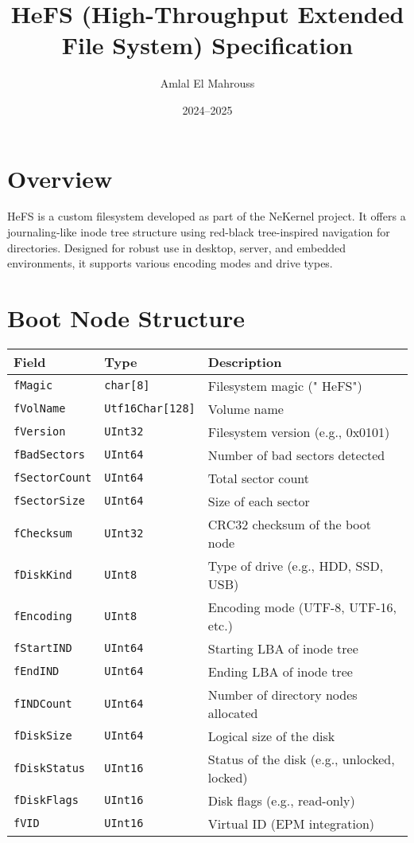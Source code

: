 \documentclass{article}
\title{HeFS (High-Throughput Extended File System) Specification}
\author{Amlal El Mahrouss}
\date{2024--2025}
\begin{document}
\maketitle

\section{Overview}
HeFS is a custom filesystem developed as part of the NeKernel project. It offers a journaling-like inode tree structure using red-black tree-inspired navigation for directories. Designed for robust use in desktop, server, and embedded environments, it supports various encoding modes and drive types.

\section{Boot Node Structure}
\begin{longtable}{|l|l|p{8cm}|}
\hline
\textbf{Field} & \textbf{Type} & \textbf{Description} \\
\hline
\verb|fMagic| & \verb|char[8]| & Filesystem magic ("  HeFS") \\
\verb|fVolName| & \verb|Utf16Char[128]| & Volume name \\
\verb|fVersion| & \verb|UInt32| & Filesystem version (e.g., 0x0101) \\
\verb|fBadSectors| & \verb|UInt64| & Number of bad sectors detected \\
\verb|fSectorCount| & \verb|UInt64| & Total sector count \\
\verb|fSectorSize| & \verb|UInt64| & Size of each sector \\
\verb|fChecksum| & \verb|UInt32| & CRC32 checksum of the boot node \\
\verb|fDiskKind| & \verb|UInt8| & Type of drive (e.g., HDD, SSD, USB) \\
\verb|fEncoding| & \verb|UInt8| & Encoding mode (UTF-8, UTF-16, etc.) \\
\verb|fStartIND| & \verb|UInt64| & Starting LBA of inode tree \\
\verb|fEndIND| & \verb|UInt64| & Ending LBA of inode tree \\
\verb|fINDCount| & \verb|UInt64| & Number of directory nodes allocated \\
\verb|fDiskSize| & \verb|UInt64| & Logical size of the disk \\
\verb|fDiskStatus| & \verb|UInt16| & Status of the disk (e.g., unlocked, locked) \\
\verb|fDiskFlags| & \verb|UInt16| & Disk flags (e.g., read-only) \\
\verb|fVID| & \verb|UInt16| & Virtual ID (EPM integration) \\
\hline
\end{longtable}
\end{document}

